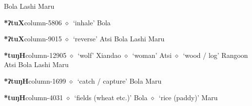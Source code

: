          Bola 
\hspace{1ex}
         Lashi 
\hspace{1ex}
         Maru 
  \item {\footnotesize \textbf{*ʔtuX}}{\tiny column-5806}
         $\diamond$~`inhale'
         Bola 
  \item {\footnotesize \textbf{*ʔtuX}}{\tiny column-9015}
         $\diamond$~`reverse'
         Atsi 
\hspace{1ex}
         Bola 
\hspace{1ex}
         Lashi 
\hspace{1ex}
         Maru 
  \item {\footnotesize \textbf{*tuŋH}}{\tiny column-12905}
         $\diamond$~`wolf'
         Xiandao 
\hspace{1ex}
         $\diamond$~`woman'
         Atsi 
\hspace{1ex}
         $\diamond$~`wood / log'
         Rangoon 
\hspace{1ex}
         Atsi 
\hspace{1ex}
         Bola 
\hspace{1ex}
         Lashi 
\hspace{1ex}
         Maru 
  \item {\footnotesize \textbf{*ʔtuŋH}}{\tiny column-1699}
         $\diamond$~`catch / capture'
         Bola 
\hspace{1ex}
         Maru 
  \item {\footnotesize \textbf{*tuŋH}}{\tiny column-4031}
         $\diamond$~`fields (wheat etc.)'
         Bola 
\hspace{1ex}
         $\diamond$~`rice (paddy)'
         Maru 
